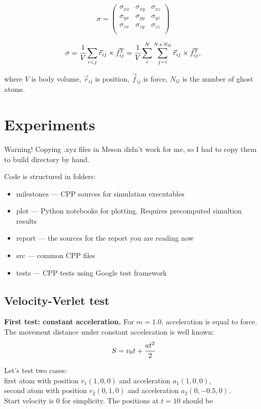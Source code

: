 \documentclass[12pt,a4paper]{article}
\newcommand{\mat}[1]{\vec{#1}}
\begin{document}
\[
\sigma =
\begin{pmatrix}
	\sigma_{xx} &\sigma_{xy} &\sigma_{xz}\\
	\sigma_{yx} &\sigma_{yy} &\sigma_{yz}\\
	\sigma_{zx} &\sigma_{zy} &\sigma_{zz}\\
\end{pmatrix}
\]

\[
\sigma = \cfrac{1}{V} \sum_{i<j} \mat{r}_{ij} \times \mat{f}^T_{ij} = \cfrac{1}{V} \sum_i^{N} \sum_{j=i}^{N+N_G} \mat{r}_{ij} \times \mat{f}^T_{ij},
\]

where $V$ is body volume, $\mat{r}_{ij}$ is position, $\mat{f}_{ij}$ is force, $N_G$ is the number of ghost atoms.


\clearpage

\section{Experiments}
\label{experiments}

Warning! Copying .xyz files in Meson didn't work for me, so I had to copy them to build directory by hand.
	
Code is structured in folders:
\begin{itemize}
	\item milestones --- CPP sources for simulation executables
	\item plot --- Python notebooks for plotting. Requires precomputed simultion results
	\item report --- the sources for the report you are reading now
	\item src --- common CPP files
	\item tests --- CPP tests using Google test framework
\end{itemize}

\subsection*{Velocity-Verlet test}

{\bf First test: constant acceleration.} For $m=1.0$, acceleration is equal to force. The movement distance under constant acceleration is well known: \[ S = v_0 t + \cfrac{at^2}{2} \]

Let's test two cases:\\
first atom with position $r_1(1, 0, 0)$ and acceleration $a_1(1, 0, 0)$,\\
second atom with position $r_2(0, 1, 0)$ and acceleration $a_2(0, -0.5, 0)$.\\
Start velocity is 0 for simplicity. The positions at $t = 10$ should be
\end{document}
